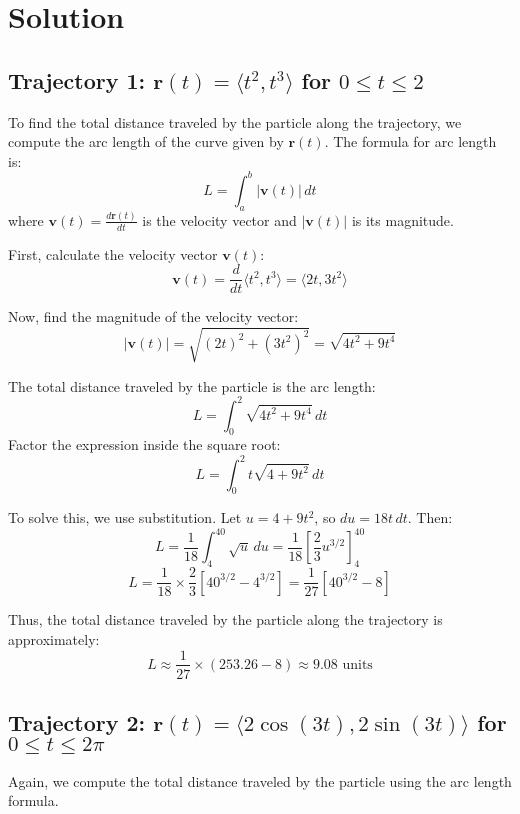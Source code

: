 \documentclass[11pt]{article}
\begin{document}
\newpage

\section{Solution}

\newpage

\subsection{Trajectory 1: \( \mathbf{r}(t) = \langle t^2, t^3 \rangle \) for \( 0 \leq t \leq 2 \)}

To find the total distance traveled by the particle along the trajectory, we compute the arc length of the curve given by \( \mathbf{r}(t) \). The formula for arc length is:
\[
L = \int_{a}^{b} |\mathbf{v}(t)| \, dt
\]
where \( \mathbf{v}(t) = \frac{d\mathbf{r}(t)}{dt} \) is the velocity vector and \( |\mathbf{v}(t)| \) is its magnitude.

First, calculate the velocity vector \( \mathbf{v}(t) \):
\[
\mathbf{v}(t) = \frac{d}{dt} \langle t^2, t^3 \rangle = \langle 2t, 3t^2 \rangle
\]

Now, find the magnitude of the velocity vector:
\[
|\mathbf{v}(t)| = \sqrt{(2t)^2 + (3t^2)^2} = \sqrt{4t^2 + 9t^4}
\]

The total distance traveled by the particle is the arc length:
\[
L = \int_{0}^{2} \sqrt{4t^2 + 9t^4} \, dt
\]
Factor the expression inside the square root:
\[
L = \int_{0}^{2} t \sqrt{4 + 9t^2} \, dt
\]

To solve this, we use substitution. Let \( u = 4 + 9t^2 \), so \( du = 18t \, dt \). Then:
\[
L = \frac{1}{18} \int_{4}^{40} \sqrt{u} \, du = \frac{1}{18} \left[ \frac{2}{3} u^{3/2} \right]_{4}^{40}
\]
\[
L = \frac{1}{18} \times \frac{2}{3} \left[ 40^{3/2} - 4^{3/2} \right]
= \frac{1}{27} \left[ 40^{3/2} - 8 \right]
\]

Thus, the total distance traveled by the particle along the trajectory is approximately:
\[
L \approx \frac{1}{27} \times (253.26 - 8) \approx 9.08 \text{ units}
\]

\newpage

\subsection{Trajectory 2: \( \mathbf{r}(t) = \langle 2 \cos(3t), 2 \sin(3t) \rangle \) for \( 0 \leq t \leq 2\pi \)}

Again, we compute the total distance traveled by the particle using the arc length formula.
\end{document}

